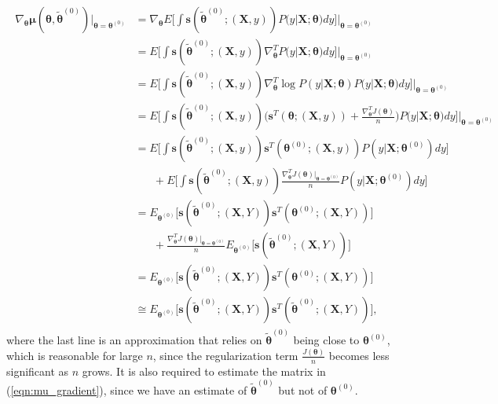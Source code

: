 \documentclass[twoside,11pt]{article}
\begin{document}
\begin{align}
\begin{aligned}
\nabla_{\bm{\theta}} \bm{\mu}(\bm { \theta}, \tilde{ \bm { \theta}} ^{ (0)}) |_{\bm{\theta} = \bm{\theta}^{(0)}} & = \nabla_{\bm{\theta}} E\big[\int \bm{s}(\tilde{ \bm { \theta}} ^{ (0)}; (\bm {X}, y)) P(y | \bm {X}; \bm{\theta}) dy \big] |_{\bm{\theta} = \bm{\theta}^{(0)}}  \\
& = E\big[\int \bm{s}( \tilde{ \bm { \theta}} ^{ (0)}; (\bm {X}, y)) \nabla^T_{\bm{\theta}} P(y | \bm {X}; \bm{\theta}) dy \big] |_{\bm{\theta} = \bm{\theta}^{(0)}} \\
& = E\big[\int \bm{s}( \tilde{ \bm { \theta}} ^{ (0)}; (\bm {X}, y)) \nabla^T_{\bm{\theta}} \log{P(y | \bm {X}; \bm{\theta})} P(y | \bm {X}; \bm{\theta}) dy \big] |_{\bm{\theta} = \bm{\theta}^{(0)}} \\
& = E\big[\int \bm{s}( \tilde{ \bm { \theta}} ^{ (0)}; (\bm {X}, y)) \big( \bm{s}^T(\bm{\theta};(\bm{X},y)) + \frac{\nabla^T_{\bm{\theta}}J(\bm{\theta})}{n} \big) P(y | \bm {X}; \bm{\theta}) dy \big] |_{\bm{\theta} = \bm{\theta}^{(0)}} \\
& = E\big[\int \bm{s}( \tilde{ \bm { \theta}} ^{ (0)}; (\bm {X}, y)) \bm{s}^T(\bm{\theta}^{(0)};(\bm{X},y)) P(y | \bm {X}; \bm{\theta}^{(0)}) dy \big] \\
& \hspace{20pt} +  E\big[\int \bm{s}( \tilde{ \bm { \theta}} ^{ (0)}; (\bm {X}, y)) \frac{\nabla^T_{\bm{\theta}}J(\bm{\theta}) |_{\bm{\theta} = \bm{\theta}^{(0)}}}{n} P(y | \bm {X}; {\bm{\theta}^{(0)}}) dy \big] \\
&  = E_{\bm { \theta}^{(0)}} \big[ \bm{s}( \tilde{ \bm { \theta}} ^{ (0)}; (\bm {X}, Y)) \bm{s}^T(\bm{\theta}^{(0)};(\bm{X},Y)) \big] \\
& \hspace{20pt} + \frac{\nabla^T_{\bm{\theta}}J(\bm{\theta}) |_{\bm{\theta} = \bm{\theta}^{(0)}}}{n} E_{\bm { \theta}^{(0)}} \big[ \bm{s}( \tilde{ \bm { \theta}} ^{ (0)}; (\bm {X}, Y)) \big] \\
&  = E_{\bm { \theta}^{(0)}} \big[ \bm{s}( \tilde{ \bm { \theta}} ^{ (0)}; (\bm {X}, Y)) \bm{s}^T(\bm{\theta}^{(0)};(\bm{X},Y)) \big] \\
& \cong E_{\bm { \theta}^{(0)}} \big[ \bm{s}( \tilde{ \bm { \theta}} ^{ (0)}; (\bm {X}, Y)) \bm{s}^T(\tilde{ \bm { \theta}} ^{ (0)};(\bm{X},Y)) \big],
\end{aligned}
\label{eqn:mu_gradient}
\end{align}
where the last line is an approximation that relies on $\tilde{ \bm { \theta}} ^{ (0)}$ being close to $\bm { \theta} ^{ (0)}$, which is reasonable for large $n$, since the regularization term $\frac{J(\bm{\theta})}{n}$ becomes less significant as $n$ grows. It is also required to estimate the matrix in (\ref{eqn:mu_gradient}), since we have an estimate of $\tilde{ \bm { \theta}} ^{ (0)}$ but not of $\bm { \theta} ^{ (0)}$. 
\end{document}
